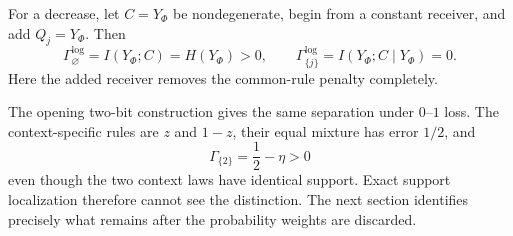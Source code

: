 For a decrease, let $C=Y_\Phi$ be nondegenerate, begin from a constant receiver, and add $Q_j=Y_\Phi$. Then
\[
\Gamma_\varnothing^{\log}=I(Y_\Phi;C)=H(Y_\Phi)>0,
\qquad
\Gamma_{\{j\}}^{\log}=I(Y_\Phi;C\mid Y_\Phi)=0.
\]
Here the added receiver removes the common-rule penalty completely.

The opening two-bit construction gives the same separation under $0$--$1$ loss. The context-specific rules are $z$ and $1-z$, their equal mixture has error $1/2$, and
\[
\Gamma_{\{2\}}=\frac12-\eta>0
\]
even though the two context laws have identical support. Exact support localization therefore cannot see the distinction. The next section identifies precisely what remains after the probability weights are discarded.
